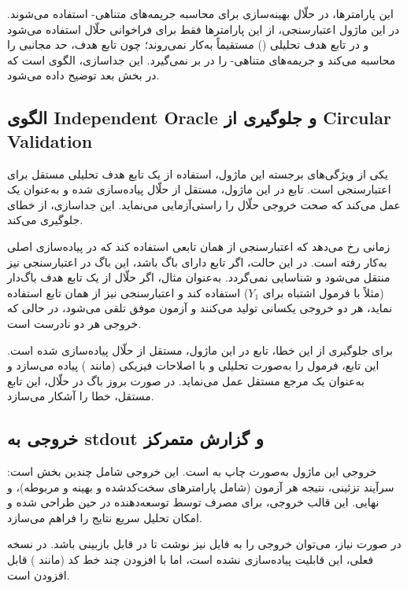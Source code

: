 این پارامترها، در حلّال بهینه‌سازی برای محاسبه جریمه‌های متناهی- استفاده می‌شوند. در این ماژول اعتبارسنجی، از این پارامترها فقط برای فراخوانی حلّال استفاده می‌شود و در تابع هدف تحلیلی () مستقیماً به‌کار نمی‌روند؛ چون تابع هدف، حد مجانبی را محاسبه می‌کند و جریمه‌های متناهی- را در بر نمی‌گیرد. این جداسازی، الگوی  است که در بخش بعد توضیح داده می‌شود.

\subsection{الگوی Independent Oracle و جلوگیری از Circular Validation}

یکی از ویژگی‌های برجسته این ماژول، استفاده از یک تابع هدف تحلیلی مستقل برای اعتبارسنجی است. تابع  در این ماژول، مستقل از حلّال پیاده‌سازی شده و به‌عنوان یک  عمل می‌کند که صحت خروجی حلّال را راستی‌آزمایی می‌نماید. این جداسازی، از خطای  جلوگیری می‌کند.

 زمانی رخ می‌دهد که اعتبارسنجی از همان تابعی استفاده کند که در پیاده‌سازی اصلی به‌کار رفته است. در این حالت، اگر تابع دارای باگ باشد، این باگ در اعتبارسنجی نیز منتقل می‌شود و شناسایی نمی‌گردد. به‌عنوان مثال، اگر حلّال از یک تابع هدف باگ‌دار (مثلاً با فرمول اشتباه برای $Y_1$) استفاده کند و اعتبارسنجی نیز از همان تابع استفاده نماید، هر دو خروجی یکسانی تولید می‌کنند و آزمون موفق تلقی می‌شود، در حالی که خروجی هر دو نادرست است.

برای جلوگیری از این خطا، تابع  در این ماژول، مستقل از حلّال پیاده‌سازی شده است. این تابع، فرمول  را به‌صورت تحلیلی و با اصلاحات فیزیکی (مانند ) پیاده می‌سازد و به‌عنوان یک مرجع مستقل عمل می‌نماید. در صورت بروز باگ در حلّال، این تابع مستقل، خطا را آشکار می‌سازد.

\subsection{خروجی به stdout و گزارش متمرکز}

خروجی این ماژول به‌صورت چاپ به  است. این خروجی شامل چندین بخش است: سرآیند تزئینی، نتیجه هر آزمون (شامل پارامترهای سخت‌کدشده و بهینه و  مربوطه)، و  نهایی. این قالب خروجی، برای مصرف توسط توسعه‌دهنده در حین  طراحی شده و امکان تحلیل سریع نتایج را فراهم می‌سازد.

در صورت نیاز، می‌توان خروجی را به فایل نیز نوشت تا در  قابل بازبینی باشد. در نسخه فعلی، این قابلیت پیاده‌سازی نشده است، اما با افزودن چند خط کد (مانند ) قابل افزودن است.

